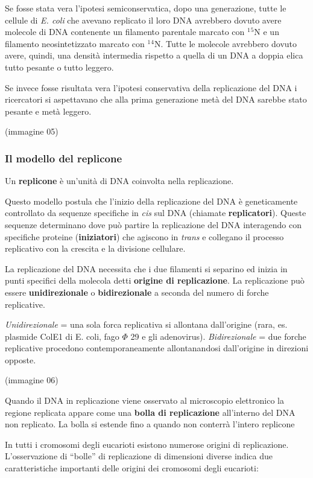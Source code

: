 \documentclass[]{article}
\begin{document}
Se fosse stata vera l'ipotesi semiconservatica, dopo una generazione,
tutte le cellule di \emph{E. coli} che avevano replicato il loro DNA
avrebbero dovuto avere molecole di DNA contenente un filamento parentale
marcato con $^1$$^5$N e un filamento neosintetizzato marcato con
$^1$$^4$N. Tutte le molecole avrebbero dovuto avere, quindi, una densità
intermedia rispetto a quella di un DNA a doppia elica tutto pesante o
tutto leggero.

Se invece fosse risultata vera l'ipotesi conservativa della replicazione
del DNA i ricercatori si aspettavano che alla prima generazione metà del
DNA sarebbe stato pesante e metà leggero.

(immagine 05)

\subsubsection{Il modello del replicone}\label{il-modello-del-replicone}

Un \textbf{replicone} è un'unità di DNA coinvolta nella replicazione.

Questo modello postula che l'inizio della replicazione del DNA è
geneticamente controllato da sequenze specifiche in \emph{cis} sul DNA
(chiamate \textbf{replicatori}). Queste sequenze determinano dove può
partire la replicazione del DNA interagendo con specifiche proteine
(\textbf{iniziatori}) che agiscono in \emph{trans} e collegano il
processo replicativo con la crescita e la divisione cellulare.

La replicazione del DNA necessita che i due filamenti si separino ed
inizia in punti specifici della molecola detti \textbf{origine di
replicazione}. La replicazione può essere \textbf{unidirezionale} o
\textbf{bidirezionale} a seconda del numero di forche replicative.

\emph{Unidirezionale} = una sola forca replicativa si allontana
dall'origine (rara, es. plasmide ColE1 di E. coli, fago $\Phi$ 29 e gli
adenovirus). \emph{Bidirezionale} = due forche replicative procedono
contemporaneamente allontanandosi dall'origine in direzioni opposte.

(immagine 06)

Quando il DNA in replicazione viene osservato al microscopio elettronico
la regione replicata appare come una \textbf{bolla di replicazione}
all'interno del DNA non replicato. La bolla si estende fino a quando non
conterrà l'intero replicone

In tutti i cromosomi degli eucarioti esistono numerose origini di
replicazione. L'osservazione di ``bolle'' di replicazione di dimensioni
diverse indica due caratteristiche importanti delle origini dei
cromosomi degli eucarioti:
\end{document}
